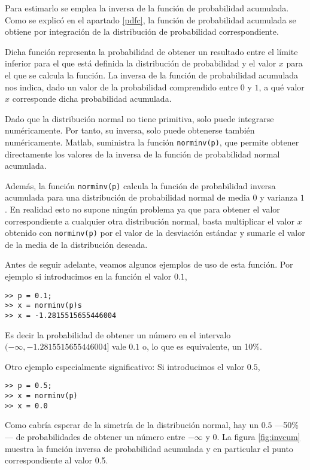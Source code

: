 Para estimarlo se emplea la inversa de la función de probabilidad acumulada. Como se explicó en el apartado \ref{pdfc}, la función de probabilidad acumulada se obtiene por integración de la distribución de probabilidad correspondiente. 

Dicha función representa la probabilidad de obtener un resultado entre el límite inferior para el que está definida la distribución de probabilidad y el valor $x$ para el que se calcula la función. La inversa de la función de probabilidad acumulada nos indica, dado un valor de la probabilidad comprendido entre $0$ y $1$, a qué valor $x$ corresponde dicha probabilidad acumulada. 

Dado que la distribución normal no tiene primitiva, solo puede integrarse numéricamente. Por tanto, su inversa, solo puede obtenerse también numéricamente. Matlab, suministra la función \texttt{norminv(p)}, que permite obtener directamente los valores de la inversa de la función de probabilidad normal acumulada.

Además, la función \texttt{norminv(p)} calcula la función de probabilidad inversa acumulada para una distribución de probabilidad normal de media $0$ y varianza $1$. En realidad esto no supone ningún problema ya que para obtener el valor correspondiente a cualquier otra distribución normal, basta multiplicar el valor $x$ obtenido con \texttt{norminv(p)} por el valor de la desviación estándar y sumarle el valor de la media de la distribución deseada.

Antes de seguir adelante, veamos algunos ejemplos de uso de esta función. Por ejemplo si introducimos en la función el valor $0.1$,
\begin{verbatim}
>> p = 0.1;
>> x = norminv(p)s
>> x = -1.2815515655446004
\end{verbatim}

Es decir la probabilidad de obtener un número en el intervalo $(-\infty, -1.2815515655446004]$ vale $0.1$ o, lo que es equivalente, un 10\%.

Otro ejemplo especialmente significativo: Si introducimos el valor $0.5$, 

\begin{verbatim}
>> p = 0.5;
>> x = norminv(p)
>> x = 0.0
\end{verbatim}

Como cabría esperar de la simetría de la distribución normal, hay un $0.5$ ---50\%--- de probabilidades de obtener un número entre $-\infty$ y $0$.  La figura \ref{fig:invcum} muestra la función inversa de probabilidad acumulada y en particular el punto  correspondiente al valor 0.5.

